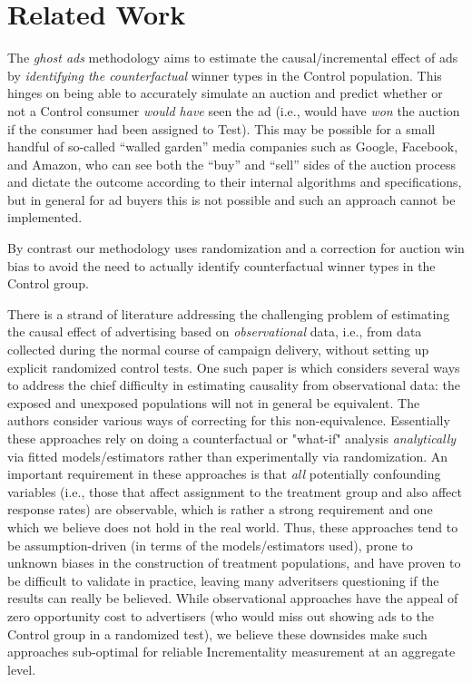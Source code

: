 \documentclass[11pt,a4paper]{article}
\theoremstyle{definition}
\theoremstyle{remark}
\theoremstyle{definition}
\theoremstyle{definition}
\theoremstyle{definition}
\theoremstyle{definition}
\theoremstyle{definition}
\theoremstyle{definition}
\begin{document}
\section{Related Work}\label{sec-related}

The \textit{ghost ads} methodology \cite{Johnson_Ghost_2015} aims to estimate the causal/incremental effect of ads by \textit{identifying the counterfactual} winner types in the Control population. This hinges on being able to accurately simulate an auction and predict whether or not a Control consumer \textit{would have} seen the ad (i.e., would have \textit{won} the auction if the consumer had been assigned to Test).
This may be possible for a small handful of so-called “walled garden” media companies such as Google, Facebook, and Amazon, who can see  both the “buy” and “sell” sides of the auction process and dictate the outcome according to their internal algorithms and specifications, but in general for ad buyers this is not possible and such an approach cannot be implemented.

By contrast our methodology uses randomization and a correction for auction win bias to avoid the need to actually identify counterfactual winner types in the Control group. 

There is a strand of literature addressing the challenging problem of estimating the causal effect of advertising based on \textit{observational} data, i.e., from data collected during the normal course of campaign delivery, without setting up explicit randomized control tests. One such paper is \cite{stitelman2011estimating} which considers several ways to address the chief difficulty in estimating causality from observational data: the exposed and unexposed populations will not in general be equivalent. The authors consider various ways of correcting for this non-equivalence. Essentially these approaches rely on doing a counterfactual or "what-if" analysis \textit{analytically} via fitted models/estimators rather than experimentally via randomization. An important requirement in these approaches is that \textit{all} potentially confounding variables (i.e., those that affect assignment to the treatment group and also affect response rates) are observable, which is rather a strong requirement and one which we believe does not hold in the real world. Thus, these approaches tend to be assumption-driven (in terms of the models/estimators used), prone to unknown biases in the construction of treatment populations, and have proven to be difficult to validate in practice, leaving many adveritsers questioning if the results can really be believed. While observational approaches have the appeal of zero  opportunity cost to advertisers (who would miss out showing ads to the Control group in a randomized test), we believe these downsides make such approaches sub-optimal for reliable Incrementality measurement at an aggregate level. 
\end{document}
